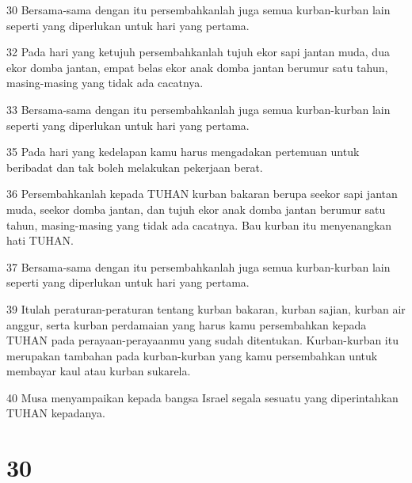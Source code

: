 \par 30 Bersama-sama dengan itu persembahkanlah juga semua kurban-kurban lain seperti yang diperlukan untuk hari yang pertama.
\par 32 Pada hari yang ketujuh persembahkanlah tujuh ekor sapi jantan muda, dua ekor domba jantan, empat belas ekor anak domba jantan berumur satu tahun, masing-masing yang tidak ada cacatnya.
\par 33 Bersama-sama dengan itu persembahkanlah juga semua kurban-kurban lain seperti yang diperlukan untuk hari yang pertama.
\par 35 Pada hari yang kedelapan kamu harus mengadakan pertemuan untuk beribadat dan tak boleh melakukan pekerjaan berat.
\par 36 Persembahkanlah kepada TUHAN kurban bakaran berupa seekor sapi jantan muda, seekor domba jantan, dan tujuh ekor anak domba jantan berumur satu tahun, masing-masing yang tidak ada cacatnya. Bau kurban itu menyenangkan hati TUHAN.
\par 37 Bersama-sama dengan itu persembahkanlah juga semua kurban-kurban lain seperti yang diperlukan untuk hari yang pertama.
\par 39 Itulah peraturan-peraturan tentang kurban bakaran, kurban sajian, kurban air anggur, serta kurban perdamaian yang harus kamu persembahkan kepada TUHAN pada perayaan-perayaanmu yang sudah ditentukan. Kurban-kurban itu merupakan tambahan pada kurban-kurban yang kamu persembahkan untuk membayar kaul atau kurban sukarela.
\par 40 Musa menyampaikan kepada bangsa Israel segala sesuatu yang diperintahkan TUHAN kepadanya.

\chapter{30}

